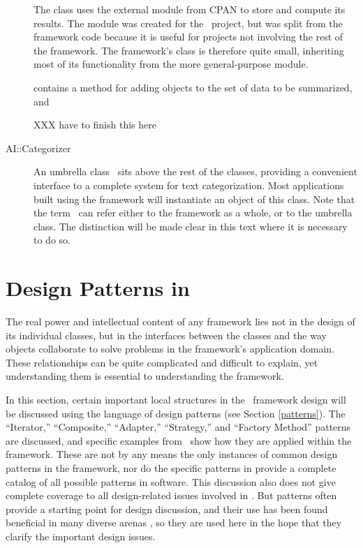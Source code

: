 \begin{description}
The  class uses the external module
 from CPAN to store and compute its
results.  The  module was created for
the \aicat\ project, but was split from the framework code because it
is useful for projects not involving the rest of the framework.  The
framework's  class is therefore quite small,
inheriting most of its functionality from the more general-purpose
module.

 contains a  method for
adding  objects to the set of data to be summarized,
and 

XXX have to finish this here

\item[AI::Categorizer]

An umbrella class \aicat\ sits above the rest of the classes,
providing a convenient interface to a complete system for text
categorization.  Most applications built using the framework will
instantiate an object of this class.  Note that the term \aicat\ can
refer either to the framework as a whole, or to the umbrella class.
The distinction will be made clear in this text where it is necessary
to do so.

\end{description}

\section{Design Patterns in \aicat}

The real power and intellectual content of any framework lies not in
the design of its individual classes, but in the interfaces between
the classes and the way objects collaborate to solve problems in the
framework's application domain. \cite[p. 31]{fayad:99} These
relationships can be quite complicated and difficult to explain, yet
understanding them is essential to understanding the framework.

In this section, certain important local structures in the \aicat\
framework design will be discussed using the language of design
patterns (see Section \ref{patterns}).  The ``Iterator,'' ``Composite,'' ``Adapter,'' ``Strategy,''
and ``Factory Method'' patterns are discussed, and specific examples
from \aicat\ show how they are applied within the framework.  These
are not by any means the only instances of common design patterns in
the framework, nor do the specific patterns in \cite{gamma:95} provide
a complete catalog of all possible patterns in software.  This
discussion also does not give complete coverage to all design-related
issues involved in \aicat.  But patterns often provide a starting
point for design discussion, and their use has been found beneficial
in many diverse arenas \cite{granlund:99}, so they are used here in
the hope that they clarify the important design issues.


